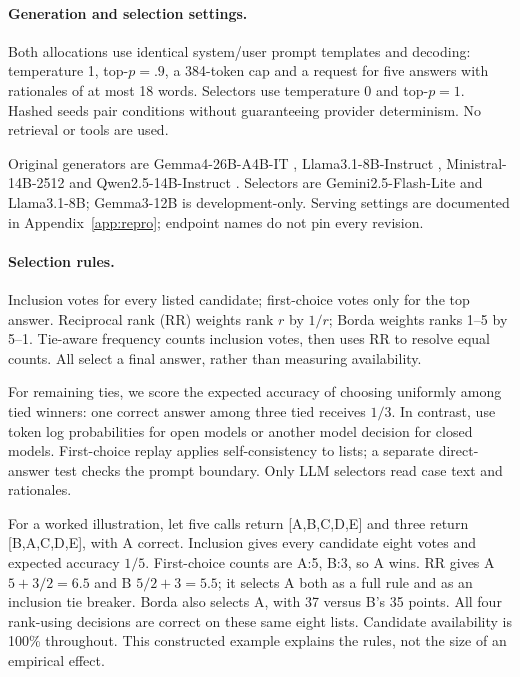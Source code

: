 \documentclass{article}
\begin{document}
\paragraph{Generation and selection settings.}
Both allocations use identical system/user prompt templates and decoding: temperature 1, top-$p=.9$, a 384-token cap and a request for five answers with rationales of at most 18 words. Selectors use temperature 0 and top-$p=1$. Hashed seeds pair conditions without guaranteeing provider determinism. No retrieval or tools are used.

Original generators are Gemma4-26B-A4B-IT \citep{google2026gemma4card}, Llama3.1-8B-Instruct \citep{meta2024llama31card}, Ministral-14B-2512 \citep{mistral2025ministralcard} and Qwen2.5-14B-Instruct \citep{qwen2024card}. Selectors are Gemini2.5-Flash-Lite \citep{google2025flashlitecard} and Llama3.1-8B; Gemma3-12B is development-only. Serving settings are documented in Appendix~\ref{app:repro}; endpoint names do not pin every revision.

\paragraph{Selection rules.}
Inclusion votes for every listed candidate; first-choice votes only for the top answer. Reciprocal rank (RR) weights rank $r$ by $1/r$; Borda weights ranks 1--5 by 5--1. Tie-aware frequency counts inclusion votes, then uses RR to resolve equal counts. All select a final answer, rather than measuring availability.

For remaining ties, we score the expected accuracy of choosing uniformly among tied winners: one correct answer among three tied receives $1/3$. In contrast, \citet{wang2025ranked} use token log probabilities for open models or another model decision for closed models. First-choice replay applies self-consistency \citep{wang2023selfconsistency} to lists; a separate direct-answer test checks the prompt boundary. Only LLM selectors read case text and rationales.

For a worked illustration, let five calls return [A,B,C,D,E] and three return [B,A,C,D,E], with A correct. Inclusion gives every candidate eight votes and expected accuracy $1/5$. First-choice counts are A:5, B:3, so A wins. RR gives A $5+3/2=6.5$ and B $5/2+3=5.5$; it selects A both as a full rule and as an inclusion tie breaker. Borda also selects A, with 37 versus B's 35 points. All four rank-using decisions are correct on these same eight lists. Candidate availability is 100\% throughout. This constructed example explains the rules, not the size of an empirical effect.
\end{document}
